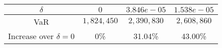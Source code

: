 \begin{center}
\begin{tabular}{c|c|c|c}
\(\delta\) & \(0\) & \(3.846e-05\) & \(1.538e-05\)\\
\hline
VaR & \(1,824,450\) & \(2,390,830\) & \(2,608,860\)\\
Increase over \(\delta=0\) & 0\% & 31.04\% & 43.00\%
\end{tabular}
\end{center}
 \label{table3}
